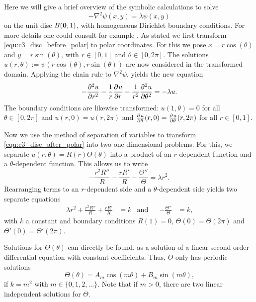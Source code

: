 Here we will give a brief overview of the symbolic calculations to solve
\begin{equation}\label{equ:c3_disc_before_polar}
    -\nabla^2 \psi(x, y) = \lambda \psi(x, y)
\end{equation}
on the unit disc $B(\vb{0}, 1)$, with homogeneous Dirichlet boundary conditions. For more details one could consult for example \cite[chapter~4]{asmar_partial_2005}. As stated we first transform \eqref{equ:c3_disc_before_polar} to polar coordinates. For this we pose $x = r\cos(\theta)$ and $y = r\sin(\theta)$, with $r \in [0,1]$ and $\theta \in [0, 2\pi]$. The solutions $u(r, \theta) := \psi(r\cos(\theta), r\sin(\theta))$ are now considered in the transformed domain. Applying the chain rule to $\nabla^2\psi$, yields the new equation
\begin{equation}\label{equ:c3_disc_after_polar}
    -{\pdv[2]{u}{r}} - \frac{1}{r}{\pdv[]{u}{r}} - \frac{1}{r^2} {\pdv[2]{u}{\theta}} = - \lambda u\text{.}
\end{equation}
The boundary conditions are likewise transformed: $u(1, \theta) = 0$ for all $\theta \in [0, 2\pi]$ and $u(r, 0) = u(r, 2\pi)$ and ${\pdv[]{u}{\theta}}(r, 0) = {\pdv[]{u}{\theta}}(r, 2\pi)$ for all $r \in [0, 1]$.

Now we use the method of separation of variables to transform \eqref{equ:c3_disc_after_polar} into two one-dimensional problems. For this, we separate $u(r, \theta) = R(r) \Theta(\theta)$ into a product of an $r$-dependent function and a $\theta$-dependent function. This allows us to write
$$
    -\frac{r^2 R''}{R} - \frac{rR'}{R} - \frac{\Theta''}{\Theta} = \lambda r^2 \text{.}
$$
Rearranging terms to an $r$-dependent side and a $\theta$-dependent side yields two separate equations
\begin{align*}
    \lambda r^2 + \frac{r^2 R''}{R} + \frac{rR'}{R} & = k & \text{and} &  & -\frac{\Theta''}{\Theta} & = k\text{,}
\end{align*}
with $k$ a constant and boundary conditions $R(1) = 0$, $\Theta(0) = \Theta(2\pi)$ and $\Theta'(0) = \Theta'(2\pi)$.

Solutions for $\Theta(\theta)$ can directly be found, as a solution of a linear second order differential equation with constant coefficients. Thus, $\Theta$ only has periodic solutions
$$
    \Theta(\theta) = A_m \cos(m\theta) + B_m \sin(m\theta)\text{,}
$$
if $k = m^2$ with $m \in \{0, 1, 2, \dots\}$. Note that if $m > 0$, there are two linear independent solutions for $\Theta$.

